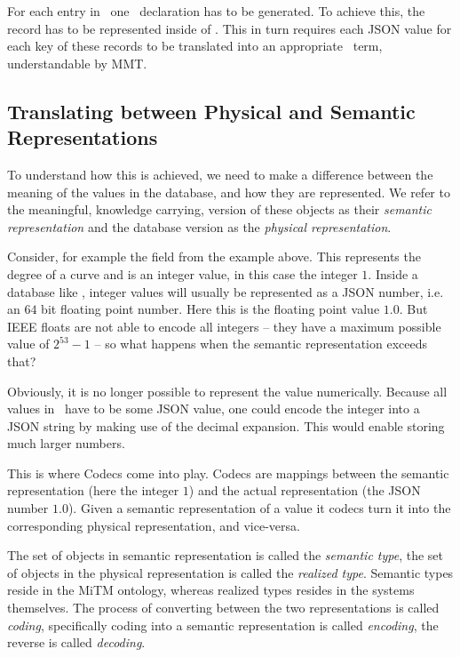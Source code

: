 For each entry in \lmfdb\ one \omdocmmt\ declaration has to be generated. 
To achieve this, the record has to be represented inside of \mmt. 
This in turn requires each JSON value for each key of these records to be translated into an appropriate \mmt\ term, understandable by MMT. 

\subsection{Translating between Physical and Semantic Representations}\label{sec:vt:translation}

To understand how this is achieved, we need to make a difference between the meaning of the values in the database, and how they are represented.
We refer to the meaningful, knowledge carrying, version of these objects as their \textit{semantic representation} and the database version as the \textit{physical representation}. 

Consider, for example the  field from the example above. 
This represents the degree of a curve and is an integer value, in this case the integer $1$. 
Inside a database like \lmfdb, integer values will usually be represented as a JSON number, i.e. an  $64$ bit floating point number. 
Here this is the floating point value $1.0$. 
But IEEE floats are not able to encode all integers -- they have a maximum possible value of $2^{53}-1$ -- so what happens when the semantic representation exceeds that?

Obviously, it is no longer possible to represent the value numerically. 
Because all values in \lmfdb\ have to be some JSON value, one could encode the integer into a JSON string by making use of the decimal expansion. 
This would enable storing much larger numbers. 

This is where Codecs come into play. 
Codecs are mappings between the semantic representation (here the integer $1$) and the actual representation (the JSON number $1.0$). 
Given a semantic representation of a value it codecs turn it into the corresponding physical representation, and vice-versa. 

The set of objects in semantic representation is called the \textit{semantic type}, the set of objects in the physical representation is called the \textit{realized type}. 
Semantic types reside in the MiTM ontology, whereas realized types resides in the systems themselves. 
The process of converting between the two representations is called \textit{coding}, specifically coding into a semantic representation is called \textit{encoding}, the reverse is called \textit{decoding}. 

